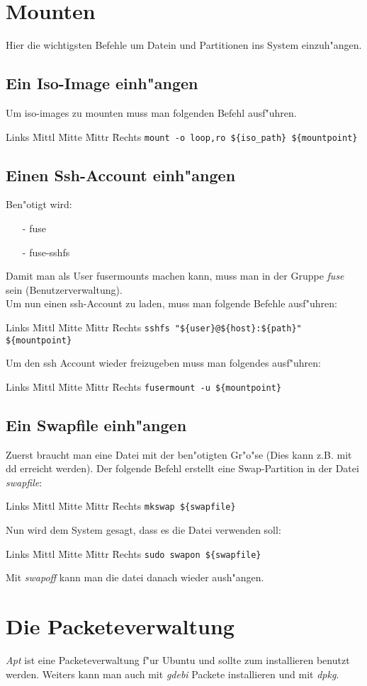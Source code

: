 \documentclass[12pt]{article}
\newenvironment{code}{\begin{tabbing}Links \= Mittl \= Mitte \= Mittr \= Rechts \kill}{\end{tabbing}}
\begin{document}
\section{Mounten}
Hier die wichtigsten Befehle um Datein und Partitionen ins System einzuh"angen.
\subsection{Ein Iso-Image einh"angen}
Um iso-images zu mounten muss man folgenden Befehl ausf"uhren.
\begin{code}
	\> \verb#mount -o loop,ro ${iso_path} ${mountpoint}#
\end{code}
\subsection{Einen Ssh-Account einh"angen}
Ben"otigt wird:
\begin{itemize}
	\item[-] fuse
	\item[-] fuse-sshfs
\end{itemize}
Damit man als User fusermounts machen kann, muss man in der Gruppe \textit{fuse} 
sein (Benutzerverwaltung).\\
Um nun einen ssh-Account zu laden, muss man folgende Befehle ausf"uhren:
\begin{code}
	\> \verb#sshfs "${user}@${host}:${path}" ${mountpoint}#
\end{code}
Um den ssh Account wieder freizugeben muss man folgendes ausf"uhren:
\begin{code}
	\> \verb#fusermount -u ${mountpoint}#
\end{code}
\subsection{Ein Swapfile einh"angen}
Zuerst braucht man eine Datei mit der ben"otigten Gr"o"se (Dies kann z.B. mit dd erreicht werden).
Der folgende Befehl erstellt eine Swap-Partition in der Datei \textit{swapfile}:
\begin{code}
	\> \verb#mkswap ${swapfile}#
\end{code}
Nun wird dem System gesagt, dass es die Datei verwenden soll:
\begin{code}
	\> \verb#sudo swapon ${swapfile}#
\end{code}
Mit \textit{swapoff} kann man die datei danach wieder aush"angen.

\section{Die Packeteverwaltung}
\textit{Apt} ist eine Packeteverwaltung f"ur Ubuntu und sollte zum installieren benutzt werden.
Weiters kann man auch mit \textit{gdebi} Packete installieren und mit \textit{dpkg}.
\end{document}
